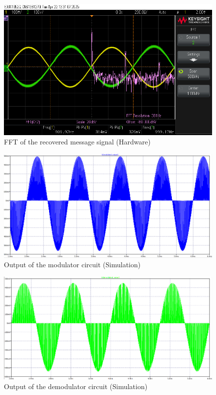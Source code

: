 \documentclass[conference]{IEEEtran}
\begin{document}
\begin{figure}
    \centering
    \includegraphics[width=1\linewidth]{Images/recovered_message_fft.png}
    \caption{FFT of the recovered message signal (Hardware)}
\end{figure}

\begin{figure}
    \centering
    \includegraphics[width=1\linewidth]{Images/modulated_output_ltspice.png}
    \caption{Output of the modulator circuit (Simulation)}
\end{figure}

\begin{figure}
    \centering
    \includegraphics[width=1\linewidth]{Images/demodulated_output_ltspice.png}
    \caption{Output of the demodulator circuit (Simulation)}
\end{figure}
\end{document}
